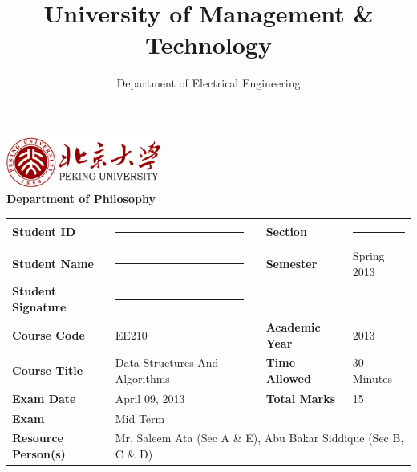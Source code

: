 \documentclass[11pt]{exam}
\title{\vspace{-7ex} University of Management \& Technology\vspace{-1ex}}
\author{Department of Electrical Engineering
}
\date{}
\newcommand{\courseCode}{EE210}
\newcommand{\courseTitle}{Data Structures And Algorithms}
\newcommand{\examDate}{April 09, 2013}
\newcommand{\examType}{Mid Term}
\newcommand{\RP}{Mr. Saleem Ata (Sec A \& E), Abu Bakar Siddique (Sec  B, C \& D)}
\newcommand{\semester}{Spring 2013}
\newcommand{\academicYear}{2013}
\newcommand{\timeAllowed}{30 Minutes}
\newcommand{\totalMarks}{15}
\newcommand{\rowSpace}{1.2ex}
\begin{document}
 

\begin{center}
\includegraphics[width=2in]{pku}
\\[.5em]\LARGE\bfseries Department of Philosophy
\end{center}

\vspace{2em}
\pagestyle{headandfoot}
\firstpageheader{}{}{}
\runningheadrule
{}

\begin{flushright}
\begin{tabular}{p{1.5in} p{2in} p{.05in} p{1.2in} p{1in}}

\textbf{Student ID}&\hrule && \textbf{Section} & \hrule \\ [\rowSpace]
\textbf{Student Name}&\hrule && \textbf{Semester}& \semester\\ [\rowSpace]
\textbf{Student Signature}&\hrule&&&\\ [\rowSpace]
\textbf{Course Code}&\courseCode && \textbf{Academic Year} & \academicYear\\
\textbf{Course Title}& \courseTitle && \textbf{Time Allowed} & \timeAllowed\\
\textbf{Exam Date}& \examDate && \textbf{Total Marks}& \totalMarks\\
\textbf{Exam}& \examType && & \\
\textbf{Resource Person(s)} & \multicolumn{4}{p{4.5in}}{\RP}\\
\end{tabular}
\end{flushright}
\end{document}

